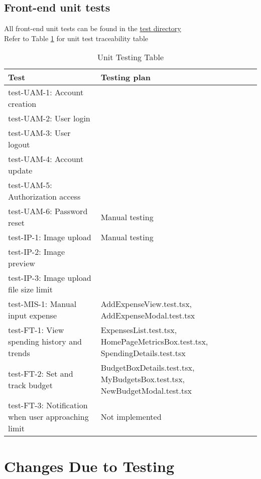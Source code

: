\documentclass[12pt, titlepage]{article}
\begin{document}
\subsection{Front-end unit tests}

All front-end unit tests can be found in the \href{https://github.com/PlutosCapstone/Plutos/tree/main/src/client/tests}{test directory}\\
Refer to Table \ref{tab:unit-testing} for unit test traceability table

\begin{table}[h]
  \centering
  \renewcommand{\arraystretch}{1.3}
  \begin{tabular}{| m{5cm} | m{8cm} |}
      \hline
      \textbf{Test} & \textbf{Testing plan} \\
      \hline
      test-UAM-1: Account creation &  \\
      \hline
      test-UAM-2: User login &  \\
      \hline
      test-UAM-3: User logout &  \\
      \hline
      test-UAM-4: Account update &  \\
      \hline
      test-UAM-5: Authorization access &  \\
      \hline
      test-UAM-6: Password reset & Manual testing \\
      \hline
      test-IP-1: Image upload & Manual testing \\
      \hline
      test-IP-2: Image preview &  \\
      \hline
      test-IP-3: Image upload file size limit &  \\
      \hline
      test-MIS-1: Manual input expense & AddExpenseView.test.tsx, AddExpenseModal.test.tsx \\
      \hline
      test-FT-1: View spending history and trends & ExpensesList.test.tsx, HomePageMetricsBox.test.tsx, SpendingDetails.test.tsx \\
      \hline
      test-FT-2: Set and track budget & BudgetBoxDetails.test.tsx, MyBudgetsBox.test.tsx, NewBudgetModal.test.tsx \\
      \hline
      test-FT-3: Notification when user approaching limit & Not implemented \\
      \hline
  \end{tabular}
  \caption{Unit Testing Table} \label{tab:unit-testing}
\end{table}


\section{Changes Due to Testing}
\end{document}
